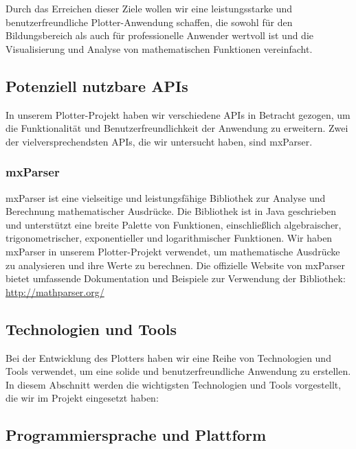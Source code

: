 \documentclass[a4paper]{article}
\begin{document}
Durch das Erreichen dieser Ziele wollen wir eine leistungsstarke und benutzerfreundliche Plotter-Anwendung schaffen, die sowohl für den Bildungsbereich als auch für professionelle Anwender wertvoll ist und die Visualisierung und Analyse von mathematischen Funktionen vereinfacht.

\newpage

\subsection{Potenziell nutzbare APIs}

In unserem Plotter-Projekt haben wir verschiedene APIs in Betracht gezogen, um die Funktionalität und Benutzerfreundlichkeit der Anwendung zu erweitern. Zwei der vielversprechendsten APIs, die wir untersucht haben, sind mxParser.

\subsubsection{mxParser}

mxParser ist eine vielseitige und leistungsfähige Bibliothek zur Analyse und Berechnung mathematischer Ausdrücke. Die Bibliothek ist in Java geschrieben und unterstützt eine breite Palette von Funktionen, einschließlich algebraischer, trigonometrischer, exponentieller und logarithmischer Funktionen. Wir haben mxParser in unserem Plotter-Projekt verwendet, um mathematische Ausdrücke zu analysieren und ihre Werte zu berechnen. Die offizielle Website von mxParser bietet umfassende Dokumentation und Beispiele zur Verwendung der Bibliothek: \url{http://mathparser.org/}

\newpage

\subsection{Technologien und Tools}

Bei der Entwicklung des Plotters haben wir eine Reihe von Technologien und Tools verwendet, um eine solide und benutzerfreundliche Anwendung zu erstellen. In diesem Abschnitt werden die wichtigsten Technologien und Tools vorgestellt, die wir im Projekt eingesetzt haben:

\subsection{Programmiersprache und Plattform}
\end{document}
